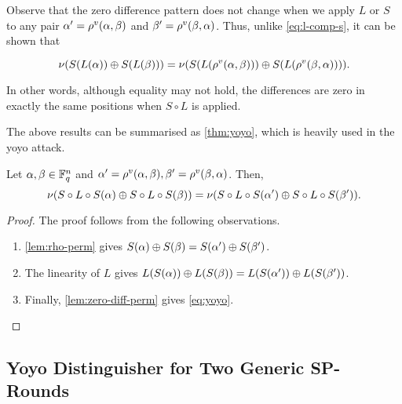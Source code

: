 \documentclass[twoside]{article}
\begin{document}
Observe that the zero difference pattern does not change when we apply \(L\) or
\(S\) to any pair \(\alpha^\prime = \rho^v(\alpha, \beta)\) and
\(\beta^\prime = \rho^v(\beta, \alpha)\). Thus, unlike \eqref{eq:l-comp-s},
it can be shown that

\begin{equation}
    \nu(S(L(\alpha)) \oplus S(L(\beta))) = \nu(S(L(\rho^v(\alpha, \beta))) \oplus S(L(\rho^v(\beta, \alpha)))).
    \label{eq:nu-s-comp-l}
\end{equation}

In other words, although equality may not hold, the differences are zero in
exactly the same positions when \(S \circ L\) is applied.

The above results can be summarised as \autoref{thm:yoyo}, which is heavily used
in the yoyo attack.

\begin{theorem}
    \label{thm:yoyo}
    Let \(\alpha, \beta \in \mathbb F_q^n\) and \(\alpha^\prime = \rho^v(\alpha,
    \beta), \beta^\prime = \rho^v(\beta, \alpha)\). Then,
    \begin{equation}
        \nu(S \circ L \circ S(\alpha) \oplus S \circ L \circ S(\beta)) = \nu(S \circ L \circ S(\alpha^\prime) \oplus S \circ L \circ S(\beta^\prime)).
        \label{eq:yoyo}
    \end{equation}
\end{theorem}
\begin{proof}
    The proof follows from the following observations.
    \begin{enumerate}
        \item \autoref{lem:rho-perm} gives \(S(\alpha) \oplus S(\beta)
        = S(\alpha^\prime) \oplus S(\beta^\prime)\).
        \item The linearity of \(L\) gives \(L(S(\alpha)) \oplus
        L(S(\beta)) = L(S(\alpha^\prime)) \oplus
        L(S(\beta^\prime))\).
        \item Finally, \autoref{lem:zero-diff-perm} gives \eqref{eq:yoyo}.
    \end{enumerate} 
\end{proof}

\subsection{Yoyo Distinguisher for Two Generic SP-Rounds}
\end{document}
